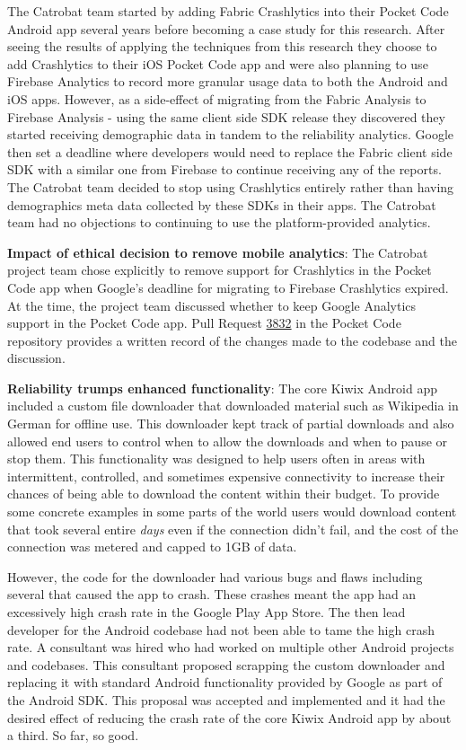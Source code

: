 The Catrobat team started by adding Fabric Crashlytics into their Pocket Code Android app several years before becoming a case study for this research. After seeing the results of applying the techniques from this research they choose to add Crashlytics to their iOS Pocket Code app and were also planning to use Firebase Analytics to record more granular usage data to both the Android and iOS apps. However, as a side-effect of migrating from the Fabric Analysis to Firebase Analysis - using the same client side SDK release they discovered they started receiving demographic data in tandem to the reliability analytics. Google then set a deadline where developers would need to replace the Fabric client side SDK with a similar one from Firebase to continue receiving any of the reports. The Catrobat team decided to stop using Crashlytics entirely rather than having demographics meta data collected by these SDKs in their apps. The Catrobat team had no objections to continuing to use the platform-provided analytics.

\textbf{Impact of ethical decision to remove mobile analytics}: The Catrobat project team chose explicitly to remove support for Crashlytics in the Pocket Code app when Google's deadline for migrating to Firebase Crashlytics expired. At the time, the project team discussed whether to keep Google Analytics support in the Pocket Code app. Pull Request 
\href{https://github.com/Catrobat/Catroid/pull/3832}{3832} in the Pocket Code repository provides a written record of the changes made to the codebase and the discussion.

\textbf{Reliability trumps enhanced functionality}: 
The core Kiwix Android app included a custom file downloader that downloaded material such as Wikipedia in German for offline use. This downloader kept track of partial downloads and also allowed end users to control when to allow the downloads and when to pause or stop them. This functionality was designed to help users often in areas with intermittent, controlled, and sometimes expensive connectivity to increase their chances of being able to download the content within their budget. To provide some concrete examples in some parts of the world users would download content that took several entire \emph{days} even if the connection didn't fail, and the cost of the connection was metered and capped to 1GB of data.

However, the code for the downloader had various bugs and flaws including several that caused the app to crash. These crashes meant the app had an excessively high crash rate in the Google Play App Store. The then lead developer for the Android codebase had not been able to tame the high crash rate. A consultant was hired who had worked on multiple other Android projects and codebases. This consultant proposed scrapping the custom downloader and replacing it with standard Android functionality provided by Google as part of the Android SDK. This proposal was accepted and implemented and it had the desired effect of reducing the crash rate of the core Kiwix Android app by about a third. So far, so good.

